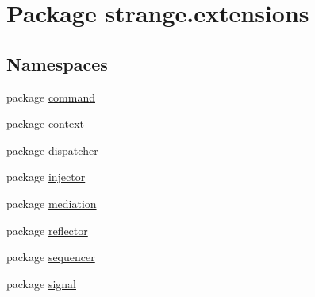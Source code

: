 \hypertarget{namespacestrange_1_1extensions}{\section{Package strange.\-extensions}
\label{namespacestrange_1_1extensions}
}
\subsection*{Namespaces}
\begin{DoxyCompactItemize}
\item 
package \hyperlink{namespacestrange_1_1extensions_1_1command}{command}
\item 
package \hyperlink{namespacestrange_1_1extensions_1_1context}{context}
\item 
package \hyperlink{namespacestrange_1_1extensions_1_1dispatcher}{dispatcher}
\item 
package \hyperlink{namespacestrange_1_1extensions_1_1injector}{injector}
\item 
package \hyperlink{namespacestrange_1_1extensions_1_1mediation}{mediation}
\item 
package \hyperlink{namespacestrange_1_1extensions_1_1reflector}{reflector}
\item 
package \hyperlink{namespacestrange_1_1extensions_1_1sequencer}{sequencer}
\item 
package \hyperlink{namespacestrange_1_1extensions_1_1signal}{signal}
\end{DoxyCompactItemize}

